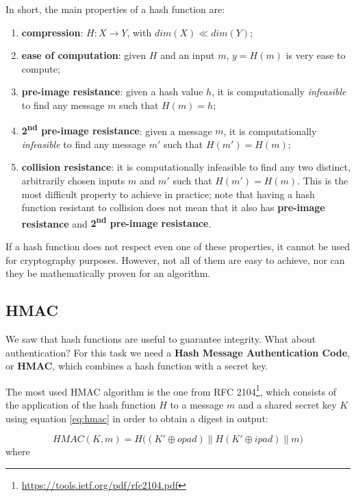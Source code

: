 \vspace{0.2em}

In short, the main properties of a hash function are:

\begin{enumerate}
    \item \textbf{compression}: $H : X \rightarrow Y$, with $dim(X) \ll dim(Y)$;
    \item \textbf{ease of computation}: given $H$ and an input $m$, $y = H(m)$ is very ease to compute;
    \item \textbf{pre-image resistance}: given a hash value $h$, it is computationally \textit{infeasible} to find any message $m$ such that $H(m) = h$;
    \item \textbf{2\textsuperscript{nd} pre-image resistance}: given a message $m$, it is computationally \textit{infeasible} to find any message $m'$ such that $H(m') = H(m)$;
    \item \textbf{collision resistance}: it is computationally infeasible to find any two distinct, arbitrarily chosen inputs $m$ and $m'$ such that $H(m') = H(m)$. This is the most difficult property to achieve in practice; note that having a hash function resistant to collision does not mean that it also has \textbf{pre-image resistance} and \textbf{2\textsuperscript{nd} pre-image resistance}.
\end{enumerate}

If a hash function does not respect even one of these properties, it cannot be used for cryptography purposes. However, not all of them are easy to achieve, nor can they be mathematically proven for an algorithm.


\subsection{HMAC}
We saw that hash functions are useful to guarantee integrity. What about authentication? For this task we need a \textbf{Hash Message Authentication Code}, or \textbf{HMAC}, which combines a hash function with a secret key.

The most used HMAC algorithm is the one from RFC 2104\footnote{\url{https://tools.ietf.org/pdf/rfc2104.pdf}}, which consists of the application of the hash function $H$ to a message $m$ and a shared secret key $K$ using equation \ref{eq:hmac} in order to obtain a digest in output:

\begin{equation}
\label{eq:hmac}
    \mathit{HMAC}(K,m) = H\Big((K' \oplus opad) \parallel H (K' \oplus ipad) \parallel m\Big)
\end{equation}
where


